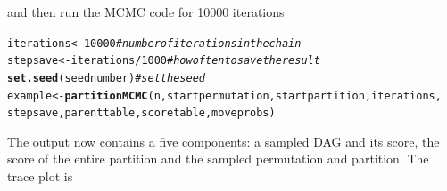 \documentclass[a4paper]{article}\usepackage[]{graphicx}\usepackage[]{color}
\makeatletter
\newcommand{\hlnum}[1]{\textcolor[rgb]{0.686,0.059,0.569}{#1}}%
\newcommand{\hlcom}[1]{\textcolor[rgb]{0.678,0.584,0.686}{\textit{#1}}}%
\newcommand{\hlopt}[1]{\textcolor[rgb]{0,0,0}{#1}}%
\newcommand{\hlstd}[1]{\textcolor[rgb]{0.345,0.345,0.345}{#1}}%
\newcommand{\hlkwb}[1]{\textcolor[rgb]{0.69,0.353,0.396}{#1}}%
\newcommand{\hlkwd}[1]{\textcolor[rgb]{0.737,0.353,0.396}{\textbf{#1}}}%
\newenvironment{kframe}{%
 \def\at@end@of@kframe{}%
 \ifinner\ifhmode%
  \def\at@end@of@kframe{\end{minipage}}%
  \begin{minipage}{\columnwidth}%
 \fi\fi%
 \def\FrameCommand##1{\hskip\@totalleftmargin \hskip-\fboxsep
 \colorbox{shadecolor}{##1}\hskip-\fboxsep
     \hskip-\linewidth \hskip-\@totalleftmargin \hskip\columnwidth}%
 \MakeFramed {\advance\hsize-\width
   \@totalleftmargin\z@ \linewidth\hsize
   \@setminipage}}%
 {\par\unskip\endMakeFramed%
 \at@end@of@kframe}
\newenvironment{knitrout}{}{} %
\newcommand{\nn}{\noindent}
\makeatother
\begin{document}
\nn and then run the MCMC code for 10000 iterations

\begin{knitrout}
\color{fgcolor}\begin{kframe}
\begin{alltt}
\hlstd{iterations} \hlkwb{<-} \hlnum{10000}  \hlcom{#number of iterations in the chain}
\hlstd{stepsave} \hlkwb{<-} \hlstd{iterations}\hlopt{/}\hlnum{1000}  \hlcom{#how often to save the result}
\hlkwd{set.seed}\hlstd{(seednumber)}  \hlcom{# set the seed}
\hlstd{example} \hlkwb{<-} \hlkwd{partitionMCMC}\hlstd{(n, startpermutation, startpartition, iterations,}
    \hlstd{stepsave, parenttable, scoretable, moveprobs)}
\end{alltt}
\end{kframe}
\end{knitrout}

\nn The output now contains a five components: a sampled DAG and its score, the score of the entire partition and the sampled permutation and partition.  The trace plot is
\end{document}
